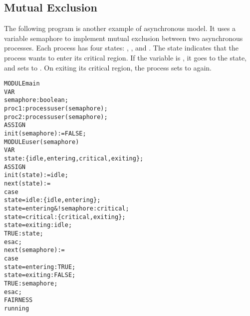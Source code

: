 

\subsection{Mutual Exclusion}
\label{Semaphore}

The following program is another example of asynchronous
model. It uses a variable semaphore to implement mutual exclusion
between two asynchronous processes.  Each process has four states:
, ,  and . The
 state indicates that the process wants to enter its
critical region. If the variable  is , it goes
to the  state, and sets  to . On
exiting its critical region, the process sets  to
 again.\\
\begin{alltt}
MODULE main
 VAR
   semaphore : boolean;
   proc1     : process user(semaphore);
   proc2     : process user(semaphore);
 ASSIGN
   init(semaphore) := FALSE;
MODULE user(semaphore)
 VAR
   state : \{idle, entering, critical, exiting\};
 ASSIGN
   init(state) := idle;
   next(state) :=
     case
       state = idle                  : \{idle, entering\};
       state = entering & !semaphore : critical;
       state = critical              : \{critical, exiting\};
       state = exiting               : idle;
       TRUE                          : state;
     esac;
   next(semaphore) :=
     case
       state = entering : TRUE;
       state = exiting  : FALSE;
       TRUE             : semaphore;
     esac;
 FAIRNESS
   running
\end{alltt}


